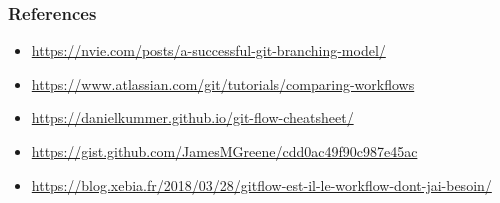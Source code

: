 \documentclass[svgnames]{beamer}
\begin{document}
%
%
%
%
%

\begin{frame}
    \frametitle{References} %

    \begin{itemize}
        \item \url{https://nvie.com/posts/a-successful-git-branching-model/}
        \item \url{https://www.atlassian.com/git/tutorials/comparing-workflows}
        \item \url{https://danielkummer.github.io/git-flow-cheatsheet/}
        \item \url{https://gist.github.com/JamesMGreene/cdd0ac49f90c987e45ac}
        \item \url{https://blog.xebia.fr/2018/03/28/gitflow-est-il-le-workflow-dont-jai-besoin/}
    \end{itemize}

\end{frame}
\end{document}
